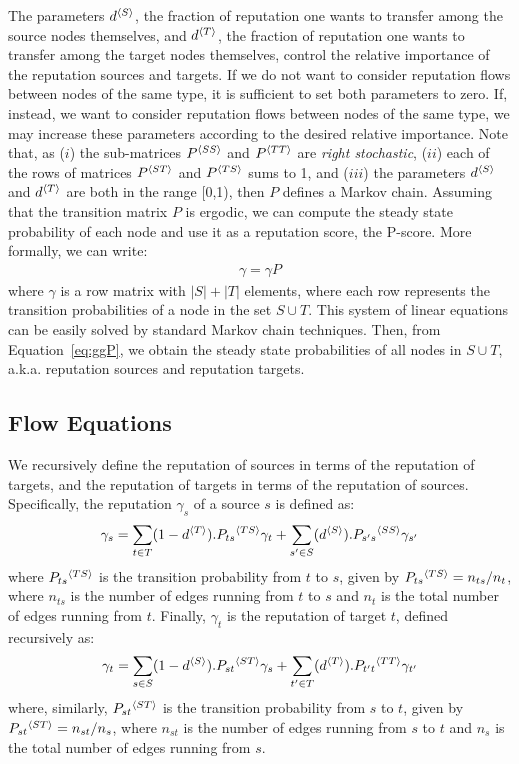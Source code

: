 \documentclass[notitlepage]{svjour3}
\begin{document}
The parameters $d{^{\langle S \rangle}}$, the fraction of reputation one wants to transfer among the source nodes themselves, 
and $d{^{\langle T \rangle}}$, the fraction of reputation one wants to transfer among the target nodes themselves,
control the relative importance of the reputation sources and targets. 
If we do not want to consider reputation flows between nodes of the same type, it is sufficient to set both parameters to zero. If, instead, we want to consider reputation flows between nodes of the same type, we may increase these parameters according to the desired relative importance. Note that, as ($i$) the sub-matrices $P{^{\langle SS \rangle}}$ and $P{^{\langle TT \rangle}}$ are \emph{right stochastic}, ($ii$) each of the rows of matrices $P{^{\langle ST \rangle}}$ and $P{^{\langle TS \rangle}}$ sums to 1, and ($iii$) the parameters $d{^{\langle S \rangle}}$ and $d{^{\langle T \rangle}}$ are both in the range [0,1), then $P$ defines a Markov chain. Assuming that the transition matrix $P$ is ergodic, we can compute the steady state probability of each node 
and use it as a reputation score, the P-score. 
More formally, we can write: 
\begin{align}
\label{eq:ggP}
\gamma = \gamma P
\end{align}
where $\gamma$ is a row matrix with $|S|+|T|$ elements, 
where each row represents the transition probabilities of a node in the set $S\cup T$. 
%
This system of linear equations can be easily solved by standard Markov chain techniques. %
Then, from Equation~\eqref{eq:ggP}, we obtain the steady state probabilities of all nodes in $S\cup T$, a.k.a. reputation sources and reputation targets.

\subsection{Flow Equations}\label{sec:flow-equations}

We recursively define the reputation of sources in terms of the reputation of targets, and the reputation of targets in terms of the reputation of sources. Specifically, the reputation $\gamma_s$ of a source $s$ is defined as:
\begin{align}
  \gamma_s = \sum_{t \in T} (1-d{^{\langle T \rangle}}).P_{ts}{^{\langle TS \rangle}} \gamma_t + \sum_{s' \in S} (d{^{\langle S \rangle}}).P_{s's}{^{\langle SS \rangle}} \gamma_{s'}\label{eqn:gs}
\end{align}
where $P_{ts}{^{\langle TS \rangle}}$ is the transition probability from $t$ to $s$, given by $P_{ts}{^{\langle TS \rangle}} = n_{ts} / n_t$, where $n_{ts}$ is the number of edges running from $t$ to $s$ and $n_t$ is the total number of edges running from $t$. Finally, $\gamma_t$ is the reputation of target $t$, defined recursively as:
\begin{align}
  \gamma_t = \sum_{s \in S} (1-d{^{\langle S \rangle}}).P_{st}{^{\langle ST \rangle}} \gamma_s + \sum_{t' \in T} (d{^{\langle T \rangle}}).P_{t't}{^{\langle TT \rangle}} \gamma_{t'}\label{eqn:gt}
\end{align}
where, similarly, $P_{st}{^{\langle ST \rangle}}$ is the transition probability from $s$ to $t$, given by $P_{st}{^{\langle ST \rangle}} = n_{st} / n_s$, where $n_{st}$ is the number of edges running from $s$ to $t$ and $n_s$ is the total number of edges running from $s$. 
\end{document}
